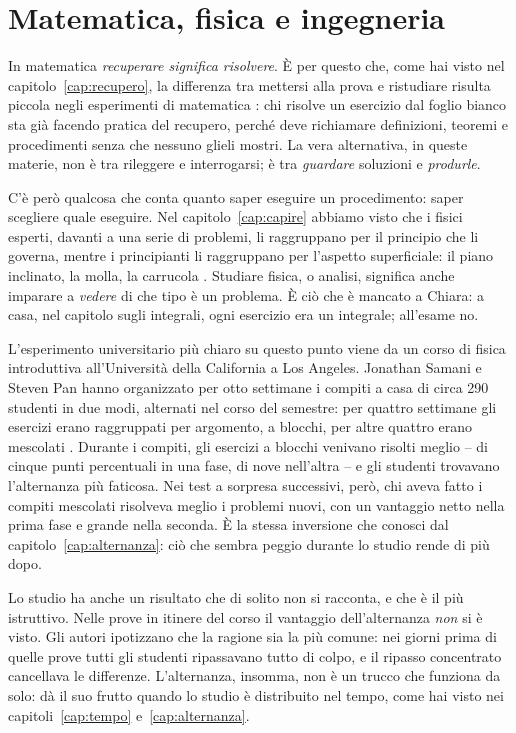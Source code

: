 \section{Matematica, fisica e ingegneria}

In matematica \emph{recuperare significa risolvere}. È per questo che,
come hai visto nel capitolo~\ref{cap:recupero}, la differenza tra
mettersi alla prova e ristudiare risulta piccola negli esperimenti di
matematica \parencite{murray2025}: chi risolve un esercizio dal foglio
bianco sta già facendo pratica del recupero, perché deve richiamare
definizioni, teoremi e procedimenti senza che nessuno glieli mostri. La
vera alternativa, in queste materie, non è tra rileggere e
interrogarsi; è tra \emph{guardare} soluzioni e \emph{produrle}.

C'è però qualcosa che conta quanto saper eseguire un procedimento: saper
scegliere quale eseguire. Nel capitolo~\ref{cap:capire} abbiamo visto
che i fisici esperti, davanti a una serie di problemi, li raggruppano
per il principio che li governa, mentre i principianti li raggruppano
per l'aspetto superficiale: il piano inclinato, la molla, la carrucola
\parencite{chi1981}. Studiare fisica, o analisi, significa anche
imparare a \emph{vedere} di che tipo è un problema. È ciò che è mancato
a Chiara: a casa, nel capitolo sugli integrali, ogni esercizio era un
integrale; all'esame no.

L'esperimento universitario più chiaro su questo punto viene da un
corso di fisica introduttiva all'Università della California a Los
Angeles. Jonathan Samani e Steven Pan hanno organizzato per otto
settimane i compiti a casa di circa 290 studenti in due modi, alternati
nel corso del semestre: per quattro settimane gli esercizi erano
raggruppati per argomento, a blocchi, per altre quattro erano
mescolati \parencite{samani2021}. Durante i compiti, gli esercizi a
blocchi venivano risolti meglio -- di cinque punti percentuali in una
fase, di nove nell'altra -- e gli studenti trovavano l'alternanza più
faticosa. Nei test a sorpresa successivi, però, chi aveva fatto i
compiti mescolati risolveva meglio i problemi nuovi, con un vantaggio
netto nella prima fase e grande nella seconda. È la stessa inversione
che conosci dal capitolo~\ref{cap:alternanza}: ciò che sembra peggio
durante lo studio rende di più dopo.

Lo studio ha anche un risultato che di solito non si racconta, e che è
il più istruttivo. Nelle prove in itinere del corso il vantaggio
dell'alternanza \emph{non} si è visto. Gli autori ipotizzano che la
ragione sia la più comune: nei giorni prima di quelle prove tutti gli
studenti ripassavano tutto di colpo, e il ripasso concentrato
cancellava le differenze. L'alternanza, insomma, non è un trucco che
funziona da solo: dà il suo frutto quando lo studio è distribuito nel
tempo, come hai visto nei capitoli~\ref{cap:tempo}
e~\ref{cap:alternanza}.

